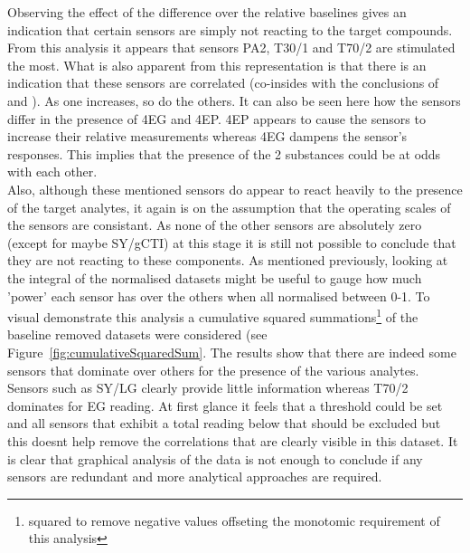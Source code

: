 \documentclass[twocolumn]{article}
\begin{document}
Observing the effect of the difference over the relative baselines gives an indication that certain sensors
are simply not reacting to the target compounds. From this analysis it appears that sensors PA2, T30/1 and T70/2
are stimulated the most. What is also apparent from this representation is that there is an indication that
these sensors are correlated (co-insides with the conclusions of \cite{wineSpoilage} and \cite{MOSAnalysis}). As one increases, so do the others. It can also be seen here how the sensors differ in
the presence of 4EG and 4EP. 4EP appears to cause the sensors to increase their relative measurements whereas 4EG
dampens the sensor's responses. This implies that the presence of the 2 substances could be at odds with each other.\\
Also, although these mentioned sensors do appear to react heavily to the presence of the target analytes, it again is 
on the assumption that the operating scales of the sensors are consistant. As none of the other sensors are absolutely zero 
(except for maybe SY/gCTI) at this stage it is still not possible to conclude that they are not reacting to these components. As mentioned
previously, looking at the integral of the normalised datasets might be useful to gauge how much 'power' each sensor has over the others
when all normalised between 0-1. To visual demonstrate this analysis a cumulative squared summations\footnote{squared to remove negative values offseting 
the monotomic requirement of this analysis} of the baseline removed datasets were considered (see Figure~\ref{fig:cumulativeSquaredSum}. 
The results show that there are indeed some sensors that dominate over others for the presence of the various analytes. Sensors such as SY/LG 
clearly provide little information whereas T70/2 dominates for EG reading. At first glance it feels that a threshold could be set and all
sensors that exhibit a total reading below that should be excluded but this doesnt help remove the correlations that are clearly visible
in this dataset. It is clear that graphical analysis of the data is not enough to conclude if any sensors are redundant and more analytical 
approaches are required.
\end{document}
